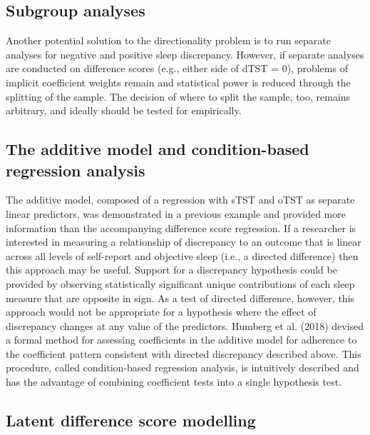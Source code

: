 \documentclass[
]{article}
\begin{document}
\subsection{Subgroup analyses}\label{subgroup-analyses}

Another potential solution to the directionality problem is to run separate analyses for negative and positive sleep discrepancy. However, if separate analyses are conducted on difference scores (e.g., either side of dTST = 0), problems of implicit coefficient weights remain and statistical power is reduced through the splitting of the sample. The decision of where to split the sample, too, remains arbitrary, and ideally should be tested for empirically.

\subsection{The additive model and condition-based regression analysis}\label{the-additive-model-and-condition-based-regression-analysis}

The additive model, composed of a regression with sTST and oTST as separate linear predictors, was demonstrated in a previous example and provided more information than the accompanying difference score regression. If a researcher is interested in measuring a relationship of discrepancy to an outcome that is linear across all levels of self-report and objective sleep (i.e., a directed difference) then this approach may be useful. Support for a discrepancy hypothesis could be provided by observing statistically significant unique contributions of each sleep measure that are opposite in sign. As a test of directed difference, however, this approach would not be appropriate for a hypothesis where the effect of discrepancy changes at any value of the predictors. Humberg et al. (2018) devised a formal method for assessing coefficients in the additive model for adherence to the coefficient pattern consistent with directed discrepancy described above. This procedure, called condition-based regression analysis, is intuitively described and has the advantage of combining coefficient tests into a single hypothesis test.

\subsection{Latent difference score modelling}\label{latent-difference-score-modelling}
\end{document}
